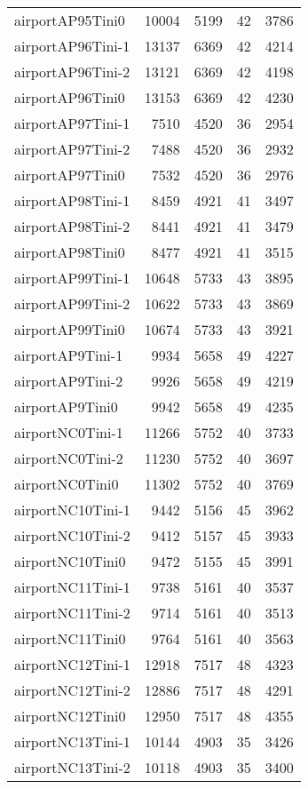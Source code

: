 \begin{longtable}{lrrrr}
airportAP95Tini0 & 10004 & 5199 & 42 & 3786 \\
airportAP96Tini-1 & 13137 & 6369 & 42 & 4214 \\
airportAP96Tini-2 & 13121 & 6369 & 42 & 4198 \\
airportAP96Tini0 & 13153 & 6369 & 42 & 4230 \\
airportAP97Tini-1 & 7510 & 4520 & 36 & 2954 \\
airportAP97Tini-2 & 7488 & 4520 & 36 & 2932 \\
airportAP97Tini0 & 7532 & 4520 & 36 & 2976 \\
airportAP98Tini-1 & 8459 & 4921 & 41 & 3497 \\
airportAP98Tini-2 & 8441 & 4921 & 41 & 3479 \\
airportAP98Tini0 & 8477 & 4921 & 41 & 3515 \\
airportAP99Tini-1 & 10648 & 5733 & 43 & 3895 \\
airportAP99Tini-2 & 10622 & 5733 & 43 & 3869 \\
airportAP99Tini0 & 10674 & 5733 & 43 & 3921 \\
airportAP9Tini-1 & 9934 & 5658 & 49 & 4227 \\
airportAP9Tini-2 & 9926 & 5658 & 49 & 4219 \\
airportAP9Tini0 & 9942 & 5658 & 49 & 4235 \\
airportNC0Tini-1 & 11266 & 5752 & 40 & 3733 \\
airportNC0Tini-2 & 11230 & 5752 & 40 & 3697 \\
airportNC0Tini0 & 11302 & 5752 & 40 & 3769 \\
airportNC10Tini-1 & 9442 & 5156 & 45 & 3962 \\
airportNC10Tini-2 & 9412 & 5157 & 45 & 3933 \\
airportNC10Tini0 & 9472 & 5155 & 45 & 3991 \\
airportNC11Tini-1 & 9738 & 5161 & 40 & 3537 \\
airportNC11Tini-2 & 9714 & 5161 & 40 & 3513 \\
airportNC11Tini0 & 9764 & 5161 & 40 & 3563 \\
airportNC12Tini-1 & 12918 & 7517 & 48 & 4323 \\
airportNC12Tini-2 & 12886 & 7517 & 48 & 4291 \\
airportNC12Tini0 & 12950 & 7517 & 48 & 4355 \\
airportNC13Tini-1 & 10144 & 4903 & 35 & 3426 \\
airportNC13Tini-2 & 10118 & 4903 & 35 & 3400 \\

\end{longtable}

